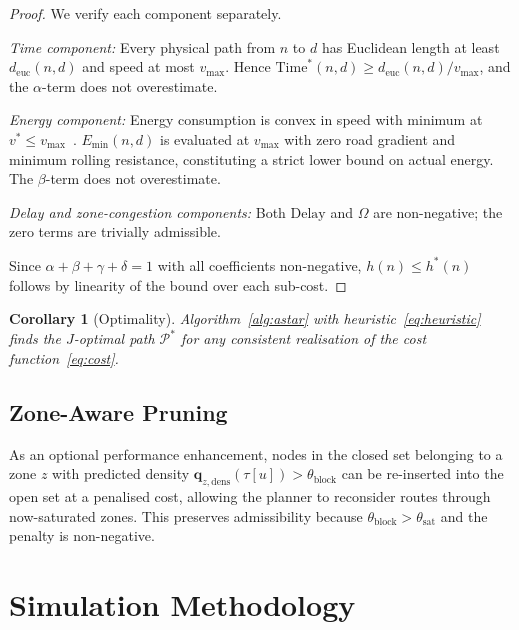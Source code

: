 \documentclass[journal,letterpaper,10pt]{IEEEtran}
\newtheorem{corollary}[theorem]{Corollary}
\theoremstyle{definition}
\theoremstyle{remark}
\newcommand{\zstate}{\mathbf{q}}
\begin{document}
\begin{proof}
We verify each component separately.

\noindent\emph{Time component:}
Every physical path from $n$ to $d$ has Euclidean length at least
$d_{\mathrm{euc}}(n,d)$ and speed at most $v_{\max}$.  Hence
$\mathrm{Time}^*(n,d)\geq d_{\mathrm{euc}}(n,d)/v_{\max}$, and
the $\alpha$-term does not overestimate.

\noindent\emph{Energy component:}
Energy consumption is convex in speed with minimum at
$v^*\leq v_{\max}$~\cite{deBruin2016}.  $E_{\min}(n,d)$ is evaluated
at $v_{\max}$ with zero road gradient and minimum rolling resistance,
constituting a strict lower bound on actual energy.  The $\beta$-term
does not overestimate.

\noindent\emph{Delay and zone-congestion components:}
Both $\mathrm{Delay}$ and $\Omega$ are non-negative; the zero terms
are trivially admissible.

Since $\alpha+\beta+\gamma+\delta=1$ with all coefficients
non-negative, $h(n)\leq h^*(n)$ follows by linearity of the bound
over each sub-cost.
\end{proof}

\begin{corollary}[Optimality]
Algorithm~\ref{alg:astar} with heuristic~\eqref{eq:heuristic} finds
the $J$-optimal path $\mathcal{P}^*$ for any consistent realisation
of the cost function~\eqref{eq:cost}.
\end{corollary}

\subsection{Zone-Aware Pruning}

As an optional performance enhancement, nodes in the closed set
belonging to a zone $z$ with predicted density
$\hat{\zstate}_{z,\mathrm{dens}}(\tau[u])>\theta_{\mathrm{block}}$
can be re-inserted into the open set at a penalised cost, allowing
the planner to reconsider routes through now-saturated zones.  This
preserves admissibility because $\theta_{\mathrm{block}}>\theta_{\mathrm{sat}}$
and the penalty is non-negative.

\section{Simulation Methodology}
\label{sec:sim}
\end{document}
